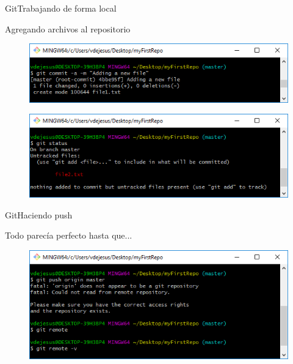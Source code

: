 \documentclass[10pt]{beamer}
\begin{document}
\begin{frame}{Git}{Trabajando de forma local}

\begin{block}{Agregando archivos al repositorio}
\begin{figure}[h!]
\centering
\includegraphics [scale=0.5]{step4_1}
\label{fig:gitstatus}
\end{figure}

\begin{figure}[h!]
\centering
\includegraphics [scale=0.5]{step4_2}
\label{fig:gitstatus}
\end{figure}

\end{block}

\end{frame}


\begin{frame}{Git}{Haciendo push}

\begin{block}{Todo parecía perfecto hasta que...}
\begin{figure}[h!]
\centering
\includegraphics [scale=0.5]{sad}
\label{fig:gitstatus}
\end{figure}

\end{block}

\end{frame}
\end{document}

